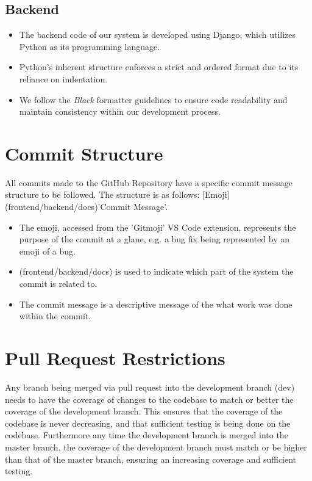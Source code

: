 \documentclass[12pt]{article}
\begin{document}
\subsection{Backend}
\begin{itemize}
    \item The backend code of our system is developed using Django, which utilizes Python as its programming language.
    \item Python's inherent structure enforces a strict and ordered format due to its reliance on indentation.
    \item We follow the \textit{Black} formatter guidelines to ensure code readability and maintain consistency within our development process.
\end{itemize}

\newpage

\section{Commit Structure}
All commits made to the GitHub Repository have a specific commit message structure to be followed. The structure is as follows: [Emoji](frontend/backend/docs)'Commit Message'.
\begin{itemize}
    \item The emoji, accessed from the 'Gitmoji' VS Code extension, represents the purpose of the commit at a glane, e.g. a bug fix being represented by an emoji of a bug.
    \item (frontend/backend/docs) is used to indicate which part of the system the commit is related to.
    \item The commit message is a descriptive message of the what work was done within the commit.
\end{itemize}

\newpage

\section{Pull Request Restrictions}
Any branch being merged via pull request into the development branch (dev) needs to have the coverage of changes to the codebase to match or better the coverage of the development branch.
This ensures that the coverage of the codebase is never decreasing, and that sufficient testing is being done on the codebase.
Furthermore any time the development branch is merged into the master branch, the coverage of the development branch must match or be higher than that of the master branch, ensuring an increasing coverage and sufficient testing.
\end{document}
